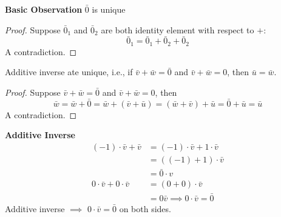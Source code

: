 \textbf{Basic Observation}  
$\bar 0$ is unique 
\begin{proof}
    Suppose $\bar 0_1$ and $\bar 0_2$ are both identity element with respect to $+$:
    \[ \bar 0_1 = \bar 0_1 + \bar 0_2 + \bar 0_2\]
    A contradiction.
\end{proof}
Additive inverse ate unique, i.e., if $\bar v + \bar w = \bar 0$ and $\bar v + \bar w = 0$, then $\bar u = \bar w$. 
\begin{proof}
    Suppose $\bar v + \bar w = \bar 0$ and $\bar v + \bar w = 0$, then
    \[\bar w = \bar w + \bar 0 = \bar w + (\bar v + \bar u) = (\bar w + \bar v) + \bar u = \bar 0 + \bar u = \bar u\]
    A contradiction.
\end{proof}
\noindent \textbf{Additive Inverse} 
\begin{align*}
    (-1) \cdot \bar v + \bar v &= (-1) \cdot \bar v + 1 \cdot \bar v \\
    &= ((-1) + 1) \cdot \bar v \\
    &= \bar 0 \cdot v \\
    0 \cdot \bar v + 0 \cdot \bar v &= (0 + 0) \cdot \bar v \\ &= 0 \bar v \implies \boxed{ 0 \cdot \bar v = \bar 0}
\end{align*} 
Additive inverse $\implies$ $0 \cdot \bar v = \bar 0$ on both sides. 
